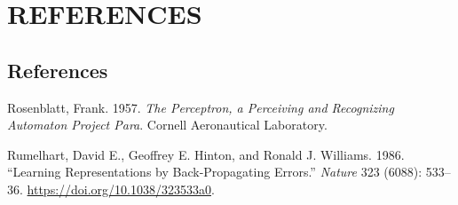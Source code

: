 \documentclass[
  11pt,
  letterpaper,
  abstract]{scrbook}
\newlength{\cslhangindent}
\newenvironment{CSLReferences}[2] %
 {\begin{list}{}{%
  \setlength{\itemindent}{0pt}
  \setlength{\leftmargin}{0pt}
  \setlength{\parsep}{0pt}
  \ifodd #1
   \setlength{\leftmargin}{\cslhangindent}
   \setlength{\itemindent}{-1\cslhangindent}
  \fi
  \setlength{\itemsep}{#2\baselineskip}}}
 {\end{list}}
\begin{document}
\part{REFERENCES}

\chapter*{References}\label{references-1}


\label{refs}
\begin{CSLReferences}{1}{0}
Rosenblatt, Frank. 1957. \emph{The Perceptron, a Perceiving and
Recognizing Automaton Project Para}. Cornell Aeronautical Laboratory.

Rumelhart, David E., Geoffrey E. Hinton, and Ronald J. Williams. 1986.
{``Learning Representations by Back-Propagating Errors.''} \emph{Nature}
323 (6088): 533--36. \url{https://doi.org/10.1038/323533a0}.

\end{CSLReferences}


\backmatter
\end{document}
